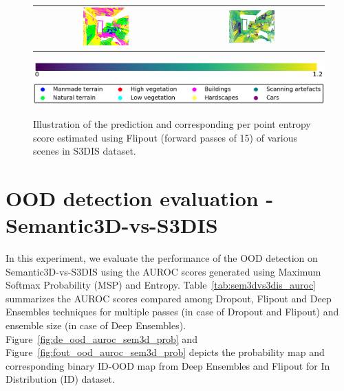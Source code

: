 \begin{figure}[h!]
\begin{tabular}{cc}
            \includegraphics[width=0.33\textwidth, height=0.18\textheight]{images/seg_output/s3dis_DE/office_42.pdf}& 
            \includegraphics[width=0.33\textwidth, height=0.18\textheight]{images/seg_output/flipout/ent_fout_s3dis_4.pdf}\\
        \end{tabular}
        \includegraphics[scale=0.45]{images/ent_legend.pdf}
        \includegraphics[scale=0.45]{images/legend.png}
        \caption{Illustration of the prediction and corresponding per point entropy score estimated using Flipout (forward passes of 15) of various scenes in S3DIS dataset.}
        \label{fig:fout_s3dis_entmap}
    \end{figure}
    \FloatBarrier
    \section{OOD detection evaluation - Semantic3D-vs-S3DIS}
    In this experiment, we evaluate the performance of the OOD detection on Semantic3D-vs-S3DIS using the AUROC scores generated using Maximum Softmax Probability (MSP) and Entropy.
    Table~\ref{tab:sem3dvs3dis_auroc} summarizes the AUROC scores compared among Dropout, Flipout and Deep Ensembles techniques for multiple passes (in case of Dropout and Flipout) and ensemble size (in case of Deep Ensembles).
    Figure~\ref{fig:de_ood_auroc_sem3d_prob} and Figure~\ref{fig:fout_ood_auroc_sem3d_prob} depicts the probability map and corresponding binary ID-OOD map from Deep Ensembles and Flipout for In Distribution (ID) dataset.
    
